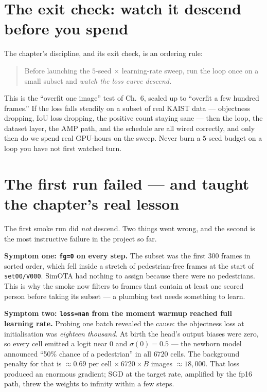 \documentclass[../main.tex]{subfiles}
\begin{document}
\section{The exit check: watch it descend before you spend}

The chapter's discipline, and its exit check, is an ordering rule:

\begin{quote}
Before launching the $5$-seed $\times$ learning-rate sweep, run the loop once on a small subset and
\emph{watch the loss curve descend.}
\end{quote}

This is the ``overfit one image'' test of Ch.~6, scaled up to ``overfit a few hundred frames.'' If
the loss falls steadily on a subset of real KAIST data --- objectness dropping, IoU loss dropping,
the positive count staying sane --- then the loop, the dataset layer, the AMP path, and the
schedule are all wired correctly, and only then do we spend real GPU-hours on the sweep. Never burn
a $5$-seed budget on a loop you have not first watched turn.

\section{The first run failed --- and taught the chapter's real lesson}

The first smoke run did \emph{not} descend. Two things went wrong, and the second is the most
instructive failure in the project so far.

\textbf{Symptom one: \texttt{fg=0} on every step.} The subset was the first $300$ frames in sorted
order, which fell inside a stretch of pedestrian-free frames at the start of \texttt{set00/V000}.
SimOTA had nothing to assign because there were no pedestrians. This is why the smoke now filters
to frames that contain at least one scored person before taking its subset --- a plumbing test needs
something to learn.

\textbf{Symptom two: \texttt{loss=nan} from the moment warmup reached full learning rate.} Probing
one batch revealed the cause: the objectness loss at initialisation was \emph{eighteen thousand}.
At birth the head's output biases were zero, so every cell emitted a logit near $0$ and
$\sigma(0)=0.5$ --- the newborn model announced ``50\% chance of a pedestrian'' in all $6720$ cells.
The background penalty for that is $\approx 0.69$ per cell $\times\,6720\times B$ images $\approx
18{,}000$. That loss produced an enormous gradient; SGD at the target rate, amplified by the fp16
path, threw the weights to infinity within a few steps.
\end{document}
